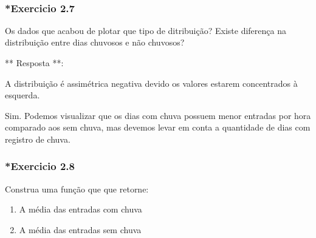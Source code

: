 \documentclass[11pt]{article}
\providecommand{\tightlist}{%
      \setlength{\itemsep}{0pt}\setlength{\parskip}{0pt}}
\begin{document}
    \begin{center}
    \end{center}
    { \hspace*{\fill} \\}
    
    \subsubsection{*Exercicio 2.7}\label{exercicio-2.7}

Os dados que acabou de plotar que tipo de ditribuição? Existe diferença
na distribuição entre dias chuvosos e não chuvosos?

    ** Resposta **:

A distribuição é assimétrica negativa devido os valores estarem
concentrados à esquerda.

Sim. Podemos visualizar que os dias com chuva possuem menor entradas por
hora comparado aos sem chuva, mas devemos levar em conta a quantidade de
dias com registro de chuva.

    \subsubsection{*Exercicio 2.8}\label{exercicio-2.8}

Construa uma função que que retorne:

\begin{enumerate}
\def\labelenumi{\arabic{enumi}.}
\tightlist
\item
  A média das entradas com chuva
\item
  A média das entradas sem chuva
\end{enumerate}
\end{document}
